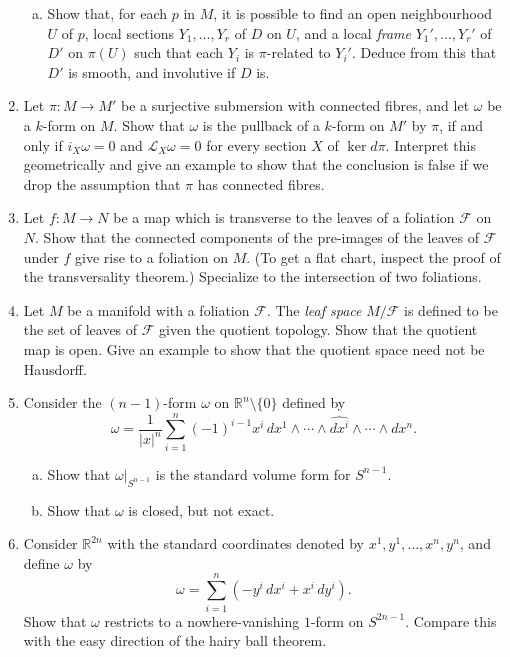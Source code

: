 \documentclass[11pt]{article} %
\begin{document}
\begin{enumerate}
\begin{enumerate}[(a)]
		\item Show that, for each $p$ in $M$, it is possible to find an open neighbourhood $U$ of $p$, local sections $Y_1, \dots, Y_r$ of $D$ on $U$, and a local \emph{frame} $Y_1', \dots, Y_r'$ of $D'$ on $\pi(U)$ such that each $Y_i$ is $\pi$-related to $Y_i'$. Deduce from this that $D'$ is smooth, and involutive if $D$ is. 
	\end{enumerate}

	\item Let $\pi\colon M \to M'$ be a surjective submersion with connected fibres, and let $\omega$ be a $k$-form on $M$. Show that $\omega$ is the pullback of a $k$-form on $M'$ by $\pi$, if and only if $i_X\omega = 0$ and $\mathcal{L}_X\omega = 0$ for every section $X$ of $\ker d\pi$. Interpret this geometrically and give an example to show that the conclusion is false if we drop the assumption that $\pi$ has connected fibres.

	\item Let $f\colon M \to N$ be a map which is transverse to the leaves of a foliation $\mathcal{F}$ on $N$. Show that the connected components of the pre-images of the leaves of $\mathcal{F}$ under $f$ give rise to a foliation on $M$. (To get a flat chart, inspect the proof of the transversality theorem.) Specialize to the intersection of two foliations.

	\item Let $M$ be a manifold with a foliation $\mathcal{F}$. The \emph{leaf space} $M/\mathcal{F}$ is defined to be the set of leaves of $\mathcal{F}$ given the quotient topology. Show that the quotient map is open. Give an example to show that the quotient space need not be Hausdorff.

	\item Consider the $(n - 1)$-form $\omega$ on $\mathbb{R}^n \setminus \{0\}$ defined by 
	\[
		\omega = \frac{1}{|x|^n} \sum_{i=1}^n (-1)^{i - 1} x^i \, dx^1 \wedge \cdots \wedge \widehat{dx^i} \wedge \cdots \wedge dx^n.
	\]
	\begin{enumerate}[(a)]
		\item Show that $\omega|_{S^{n-1}}$ is the standard volume form for $S^{n-1}$.
		\item Show that $\omega$ is closed, but not exact.
	\end{enumerate}

	\item Consider $\mathbb{R}^{2n}$ with the standard coordinates denoted by $x^1,y^1,\dots,x^n,y^n$, and define $\omega$ by 
	\[
		\omega = \sum_{i=1}^n \left(-y^i \, dx^i + x^i \, dy^i \right).
	\]
	Show that $\omega$ restricts to a nowhere-vanishing $1$-form on $S^{2n - 1}$. Compare this with the easy direction of the hairy ball theorem.


\end{enumerate}
\end{document}
